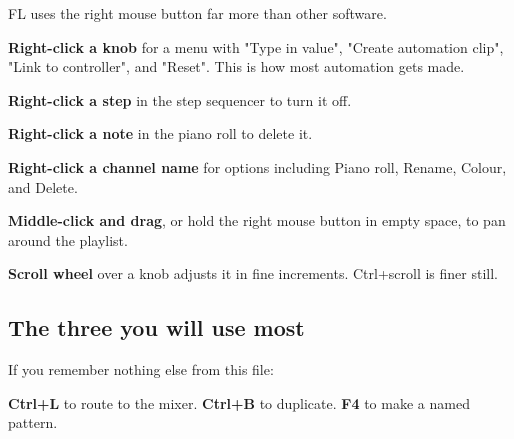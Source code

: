 FL uses the right mouse button far more than other software.

\textbf{Right-click a knob} for a menu with "Type in value", "Create automation clip", "Link to
controller", and "Reset". This is how most automation gets made.

\textbf{Right-click a step} in the step sequencer to turn it off.

\textbf{Right-click a note} in the piano roll to delete it.

\textbf{Right-click a channel name} for options including Piano roll, Rename, Colour, and Delete.

\textbf{Middle-click and drag}, or hold the right mouse button in empty space, to pan around the
playlist.

\textbf{Scroll wheel} over a knob adjusts it in fine increments. Ctrl+scroll is finer still.

\subsection{The three you will use most}\label{fl04_shortcuts-the-three-you-will-use-most}

If you remember nothing else from this file:

\textbf{Ctrl+L} to route to the mixer.
\textbf{Ctrl+B} to duplicate.
\textbf{F4} to make a named pattern.
